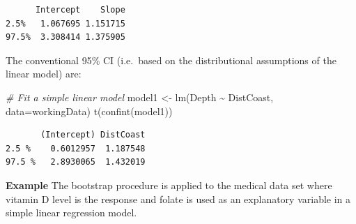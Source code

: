 \documentclass[
  oneside]{krantz}
\newenvironment{Shaded}{\begin{snugshade}}{\end{snugshade}}
\newcommand{\AttributeTok}[1]{\textcolor[rgb]{0.77,0.63,0.00}{#1}}
\newcommand{\CommentTok}[1]{\textcolor[rgb]{0.56,0.35,0.01}{\textit{#1}}}
\newcommand{\FunctionTok}[1]{\textcolor[rgb]{0.00,0.00,0.00}{#1}}
\newcommand{\NormalTok}[1]{#1}
\newcommand{\OtherTok}[1]{\textcolor[rgb]{0.56,0.35,0.01}{#1}}
\newcommand{\SpecialCharTok}[1]{\textcolor[rgb]{0.00,0.00,0.00}{#1}}
\begin{document}
\begin{verbatim}
      Intercept    Slope
2.5%   1.067695 1.151715
97.5%  3.308414 1.375905
\end{verbatim}

The conventional 95\% CI (i.e.~based on the distributional assumptions of the linear model) are:

\begin{Shaded}
\begin{Highlighting}[]
\CommentTok{\# Fit a simple linear model}
\NormalTok{model1 }\OtherTok{\textless{}{-}} \FunctionTok{lm}\NormalTok{(Depth }\SpecialCharTok{\textasciitilde{}}\NormalTok{ DistCoast, }\AttributeTok{data=}\NormalTok{workingData)}
\FunctionTok{t}\NormalTok{(}\FunctionTok{confint}\NormalTok{(model1))}
\end{Highlighting}
\end{Shaded}

\begin{verbatim}
       (Intercept) DistCoast
2.5 %    0.6012957  1.187548
97.5 %   2.8930065  1.432019
\end{verbatim}

\textbf{Example} The bootstrap procedure is applied to the medical data set where vitamin D level is the response and folate is used as an explanatory variable in a simple linear regression model.
\end{document}
